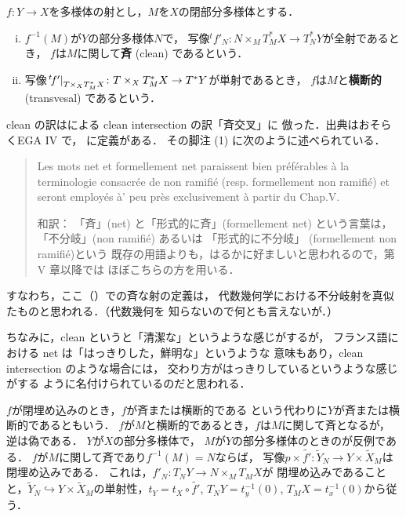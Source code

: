 \(f\colon Y\to X\)を多様体の射とし，\(M\)を\(X\)の閉部分多様体とする．

\begin{DFN}\label{def415}
    \begin{enumerate}[(i)]
        \item  \(f^{-1}(M)\)が\(Y\)の部分多様体\(N\)で，
        写像\(
            {}^{t}\!f'_{N}\colon 
            N\times_{M}T^{\ast}_{M}X\to T^{\ast}_{N}Y
        \)が全射であるとき，
        \(f\)は\(M\)に関して\textbf{斉} (clean) であるという．
        \item  写像\(
            \mres[{}^{t}\!f']{T\times_{X}T^{\ast}_{M}X}\colon 
            T\times_{X}T^{\ast}_{M}X\to T^{\ast}Y
        \)が単射であるとき，
        \(f\)は\(M\)と\textbf{横断的} (transvesal) であるという．
    \end{enumerate}
\end{DFN}

\begin{CMT}
    clean の訳は\cite{Fuk99}による clean intersection の訳「斉交叉」に
    倣った．出典はおそらくEGA IV で，
    \cite[Def.17.3.1]{EGA IV}に定義がある．
    その脚注 (1) に次のように述べられている．
    \begin{quote}
        Les mots net et formellement net paraissent 
        bien pr\'ef\'erables \`a la terminologie 
        consacr\'ee de non ramifi\'e (resp. formellement 
        non ramifi\'e) et seront employ\'es \`a' 
        peu pr\`es exclusivement \`a partir du Chap.V.

        和訳：
        「斉」(net) と「形式的に斉」(formellement net) という言葉は，
        「不分岐」(non ramifi\'e) あるいは
        「形式的に不分岐」 (formellement non ramifi\'e)という
        既存の用語よりも，はるかに好ましいと思われるので，第 V 章以降では
        ほぼこちらの方を用いる．
    \end{quote}
    すなわち，ここ（\cite{KS90}）での斉な射の定義は，
    代数幾何学における不分岐射を真似たものと思われる．（代数幾何を
    知らないので何とも言えないが．）

    ちなみに，clean というと「清潔な」というような感じがするが，
    フランス語における net は「はっきりした，鮮明な」というような
    意味もあり，clean intersection のような場合には，
    交わり方がはっきりしているというような感じがする
    ように名付けられているのだと思われる．
\end{CMT}

\(f\)が閉埋め込みのとき，\(f\)が斉または横断的である
という代わりに\(Y\)が斉または横断的であるともいう．
\(f\)が\(M\)と横断的であるとき，\(f\)は\(M\)に関して斉となるが，
逆は偽である．
\(Y\)が\(X\)の部分多様体で，
\(M\)が\(Y\)の部分多様体のときのが反例である．
\(f\)が\(M\)に関して斉であり\(f^{-1}(M)=N\)ならば，
写像\(
    p\times\tilde{f'}\colon
    \widetilde{Y}_N\to Y\times \widetilde{X}_M
\)は閉埋め込みである．
これは，\(f'_N\colon T_{N}Y\to N\times_{M}T_{M}X\)が
閉埋め込みであることと，\(
    \widetilde{Y}_{N}
    \hookrightarrow 
    Y\times \widetilde{X}_M
\)の単射性，\(t_Y=t_X\circ\tilde{f'}\), 
\(T_{N}Y=t_y^{-1}(0)\), \(T_{M}X=t_x^{-1}(0)\)から従う． 

